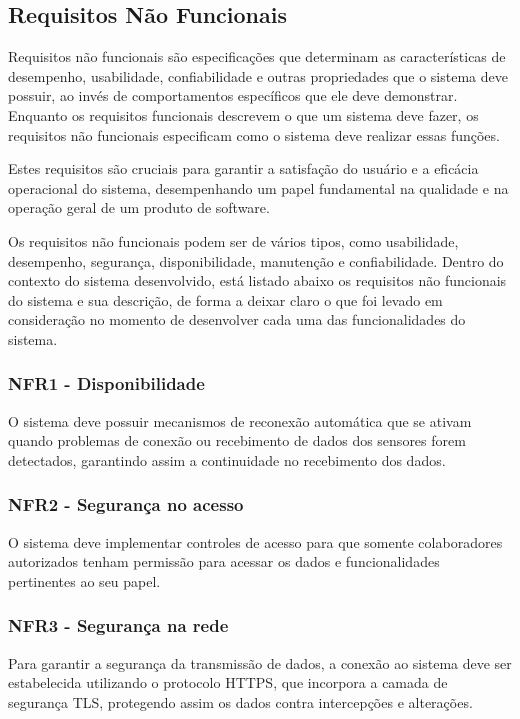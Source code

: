 \subsection[Requisitos Não Funcionais]{Requisitos Não Funcionais}
Requisitos não funcionais são especificações que determinam as características de desempenho, usabilidade, confiabilidade e outras propriedades que o sistema deve possuir, ao invés de comportamentos específicos que ele deve demonstrar. Enquanto os requisitos funcionais descrevem o que um sistema deve fazer, os requisitos não funcionais especificam como o sistema deve realizar essas funções.

Estes requisitos são cruciais para garantir a satisfação do usuário e a eficácia operacional do sistema, desempenhando um papel fundamental na qualidade e na operação geral de um produto de software.

Os requisitos não funcionais podem ser de vários tipos, como usabilidade, desempenho, segurança, disponibilidade, manutenção e confiabilidade. Dentro do contexto do sistema desenvolvido, está listado abaixo os requisitos não funcionais do sistema e sua descrição, de forma a deixar claro o que foi levado em consideração no momento de desenvolver cada uma das funcionalidades do sistema.

\subsubsection{NFR1 - Disponibilidade}
O sistema deve possuir mecanismos de reconexão automática que se ativam quando problemas de conexão ou recebimento de dados dos sensores forem detectados, garantindo assim a continuidade no recebimento dos dados.

\subsubsection{NFR2 - Segurança no acesso}
O sistema deve implementar controles de acesso para que somente colaboradores autorizados tenham permissão para acessar os dados e funcionalidades pertinentes ao seu papel.

\subsubsection{NFR3 - Segurança na rede}
Para garantir a segurança da transmissão de dados, a conexão ao sistema deve ser estabelecida utilizando o protocolo HTTPS, que incorpora a camada de segurança TLS, protegendo assim os dados contra intercepções e alterações.

